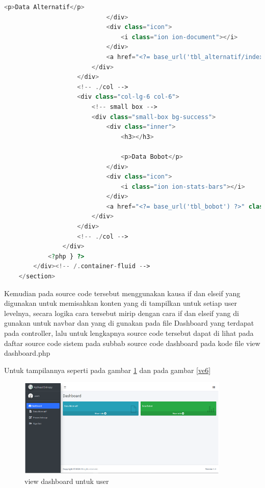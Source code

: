 \begin{lstlisting}[language=PHP]
	                            <p>Data Alternatif</p>  
	                        </div>  
	                        <div class="icon">  
	                            <i class="ion ion-document"></i>  
	                        </div>  
	                        <a href="<?= base_url('tbl_alternatif/index_user') ?>" class="small-box-footer">More info <i class="fas fa-arrow-circle-right"></i></a>  
	                    </div>  
	                </div>  
	                <!-- ./col -->  
	                <div class="col-lg-6 col-6">  
	                    <!-- small box -->  
	                    <div class="small-box bg-success">  
	                        <div class="inner">  
	                            <h3></h3>  
	  
	                            <p>Data Bobot</p>  
	                        </div>  
	                        <div class="icon">  
	                            <i class="ion ion-stats-bars"></i>  
	                        </div>  
	                        <a href="<?= base_url('tbl_bobot') ?>" class="small-box-footer">More info <i class="fas fa-arrow-circle-right"></i></a>  
	                    </div>  
	                </div>  
	                <!-- ./col -->  
	            </div>  
	        <?php } ?>  
	    </div><!-- /.container-fluid -->  
	</section>  
\end{lstlisting}

Kemudian pada source code tersebut menggunakan kausa if dan elseif yang digunakan untuk memisahkan konten yang di tampilkan untuk setiap user levelnya, secara logika cara tersebut mirip dengan cara if dan elseif yang di gunakan untuk navbar dan yang di gunakan pada file Dashboard yang terdapat pada controller, lalu untuk lengkapnya source code tersebut dapat di lihat pada daftar source code sistem pada subbab source code dashboard pada kode file view  dashboard.php\par
Untuk tampilannya seperti pada gambar \ref{ve5} dan pada gambar \ref{ve6}
\pagebreak
\begin{figure}[!htbp]
	\centerline{\includegraphics[width=0.90\textwidth]{figures/view/5.png}}
	\caption{view dashboard untuk user}
	\label{ve5}
\end{figure}

